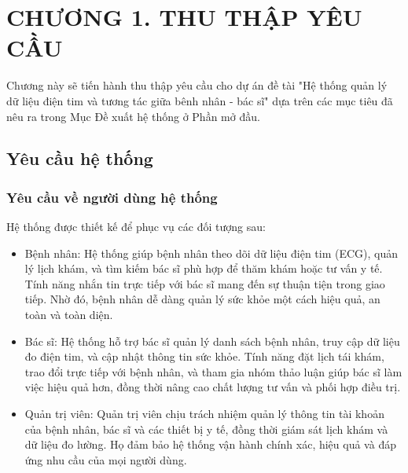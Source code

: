 
\section*{CHƯƠNG 1. THU THẬP YÊU CẦU}
\setcounter{section}{1}
\setcounter{subsection}{0} %
\setcounter{table}{0} %
\setcounter{figure}{0} %
Chương này sẽ tiến hành thu thập yêu cầu cho dự án đề tài "Hệ thống quản lý dữ liệu điện tim và tương tác giữa bênh nhân - bác sĩ"
dựa trên các mục tiêu đã nêu ra trong Mục Đề xuất hệ thống ở Phần mở đầu.

\subsection{Yêu cầu hệ thống}
\subsubsection{Yêu cầu về người dùng hệ thống}
Hệ thống được thiết kế để phục vụ các đối tượng sau:
\begin{adjustwidth}{1.5em}{}
\begin{itemize}
    \item Bệnh nhân: Hệ thống giúp bệnh nhân theo dõi dữ liệu điện tim (ECG), quản lý lịch khám, và tìm kiếm bác sĩ phù hợp để thăm khám hoặc tư vấn y tế.
    Tính năng nhắn tin trực tiếp với bác sĩ mang đến sự thuận tiện trong giao tiếp. Nhờ đó, bệnh nhân dễ dàng quản lý sức khỏe một cách hiệu quả, an toàn và toàn diện.
    
    \item Bác sĩ: Hệ thống hỗ trợ bác sĩ quản lý danh sách bệnh nhân, truy cập dữ liệu đo điện tim, và cập nhật thông tin sức khỏe.
    Tính năng đặt lịch tái khám, trao đổi trực tiếp với bệnh nhân, và tham gia nhóm thảo luận giúp bác sĩ làm việc hiệu quả hơn, đồng thời nâng cao chất lượng tư vấn và phối hợp điều trị.
    
    \item Quản trị viên: Quản trị viên chịu trách nhiệm quản lý thông tin tài khoản của bệnh nhân, bác sĩ và các thiết bị y tế, đồng thời giám sát lịch khám và dữ liệu đo lường.
    Họ đảm bảo hệ thống vận hành chính xác, hiệu quả và đáp ứng nhu cầu của mọi người dùng.
    
\end{itemize}
\end{adjustwidth}

